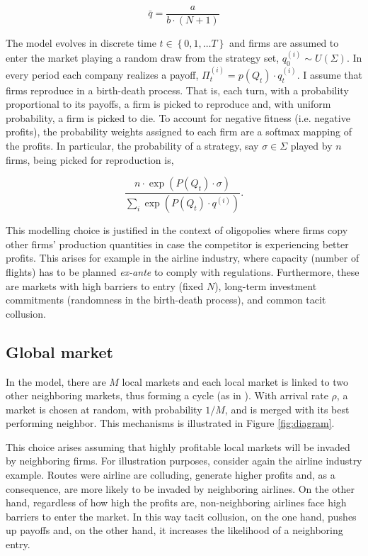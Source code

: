 \documentclass[american]{scrartcl}
\newcommand{\set}[1]{\left\{#1\right\}}
\begin{document}
\begin{equation} \label{equilib}
    \bar{q}= \frac{a}{b \cdot (N+1)}
\end{equation}

The model evolves in discrete time $t \in \set{0, 1, \ldots T}$ and firms are assumed to enter the market playing a random draw from the strategy set,  $q^{(i)}_0 \sim U(\Sigma)$. In every period each company realizes a payoff, $\Pi^{(i)}_t = p(Q_t) \cdot q^{(i)}_t$. I assume that firms reproduce in a birth-death process. That is, each turn, with a probability proportional to its payoffs, a firm is picked to reproduce and, with uniform probability, a firm is picked to die. To account for negative fitness (i.e. negative profits), the probability weights assigned to each firm are a softmax mapping of the profits. In particular, the probability of a strategy, say $\sigma \in \Sigma$ played by $n$ firms, being picked for reproduction is,

\begin{equation}
    \frac{n \cdot \exp(P(Q_t) \cdot \sigma)}{\sum_{i} \exp(P(Q_t) \cdot q^{(i)})}.
\end{equation}



This modelling choice is justified in the context of oligopolies where firms copy other firms' production quantities in case the competitor is experiencing better profits. This arises for example in the airline industry, where capacity (number of flights) has to be planned \textit{ex-ante} to comply with regulations. Furthermore, these are markets with high barriers to entry (fixed $N$), long-term investment commitments (randomness in the birth-death process), and common tacit collusion.

\subsection{Global market}

In the model, there are $M$ local markets and each local market is linked to two other neighboring markets, thus forming a cycle (as in \cite{Akdeniz2020}). With arrival rate $\rho$, a market is chosen at random, with probability $1 / M$, and is merged with its best performing neighbor. This mechanisms is illustrated in Figure \ref{fig:diagram}.

This choice arises assuming that highly profitable local markets will be invaded by neighboring firms. For illustration purposes, consider again the airline industry example. Routes were airline are colluding, generate higher profits and, as a consequence, are more likely to be invaded by neighboring airlines. On the other hand, regardless of how high the profits are, non-neighboring airlines face high barriers to enter the market. In this way tacit collusion, on the one hand, pushes up payoffs and, on the other hand, it increases the likelihood of a neighboring entry.
\end{document}
